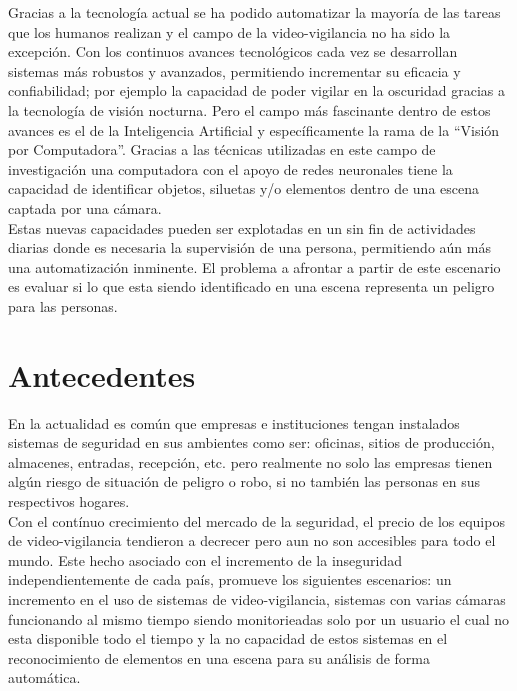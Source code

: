 Gracias a la tecnología actual se ha podido automatizar la mayoría de las tareas que los humanos realizan y el campo de la video-vigilancia no ha sido la excepción. Con los continuos avances tecnológicos cada vez se desarrollan sistemas más robustos y avanzados, permitiendo incrementar su eficacia y confiabilidad; por ejemplo la capacidad de poder vigilar en la oscuridad gracias a la tecnología de visión nocturna. Pero el campo más fascinante dentro de estos avances es el de la Inteligencia Artificial y específicamente la rama de la ``Visión por Computadora''. Gracias a las técnicas utilizadas en este campo de investigación una computadora con el apoyo de redes neuronales tiene la capacidad de identificar objetos, siluetas y/o elementos dentro de una escena captada por una cámara.\\

Estas nuevas capacidades pueden ser explotadas en un sin fin de actividades diarias donde es necesaria la supervisión de una persona, permitiendo aún más una automatización inminente. El problema a afrontar a partir de este escenario es evaluar si lo que esta siendo identificado en una escena representa un peligro para las personas.

\section{Antecedentes}
En la actualidad es común que empresas e instituciones tengan instalados sistemas de seguridad en sus ambientes como ser: oficinas, sitios de producción, almacenes, entradas, recepción, etc. pero realmente no solo las empresas tienen algún riesgo de situación de peligro o robo, si no también las personas en sus respectivos hogares.\\

Con el contínuo crecimiento del mercado de la seguridad, el precio de los equipos de video-vigilancia tendieron a decrecer pero aun no son accesibles para todo el mundo. Este hecho asociado con el incremento de la inseguridad independientemente de cada país, promueve los siguientes escenarios: un incremento en el uso de sistemas de video-vigilancia, sistemas con varias cámaras funcionando al mismo tiempo siendo monitorieadas solo por un usuario el cual no esta disponible todo el tiempo y la no capacidad de estos sistemas en el reconocimiento de  elementos en una escena para su análisis de forma automática.\

